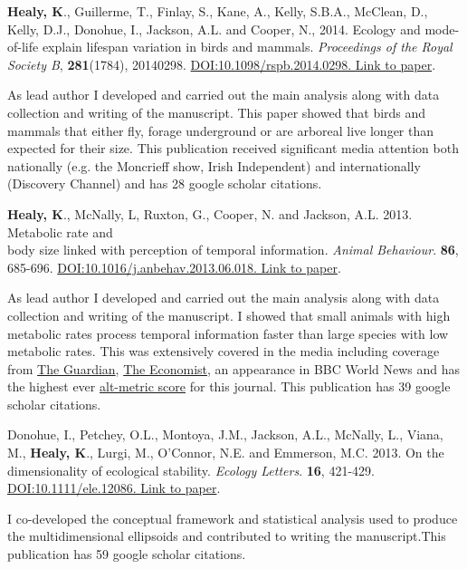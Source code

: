 \documentclass[10pt,a4paper]{article}
\begin{document}
\begin{flushleft}
\bigskip

\textbf{Healy, K}., Guillerme, T., Finlay, S., Kane, A., Kelly, S.B.A., McClean, D., Kelly, D.J., Donohue, I., Jackson, A.L. and Cooper, N., 2014. Ecology and mode-of-life explain lifespan variation in birds and mammals. \textit{Proceedings of the Royal Society B}, \textbf{281}(1784), 20140298. \href{http://rspb.royalsocietypublishing.org/content/281/1784/20140298}{DOI:10.1098/rspb.2014.0298. Link to paper}.
\smallskip
\par{\fontsize{10.5}{10} As lead author I developed and carried out the main analysis along with data collection and writing of the manuscript. This paper showed that birds and mammals that either fly, forage underground or are arboreal live longer than expected for their size. This publication received significant media attention both nationally (e.g. the Moncrieff show, Irish Independent) and internationally (Discovery Channel) and has 28 google scholar citations.}

\bigskip

\textbf{Healy, K}., McNally, L, Ruxton, G., Cooper, N. and Jackson, A.L. 2013. Metabolic rate and\\
body size linked with perception of temporal information.  \textit{Animal Behaviour}. \textbf{86}, 685-696. \href{http://dx.doi.org/10.1016/j.anbehav.2013.06.018}{DOI:10.1016/j.anbehav.2013.06.018. Link to paper}.
\smallskip
\par{\fontsize{10.5}{10} As lead author I developed and carried out the main analysis along with data collection and writing of the manuscript. I showed that small animals with high metabolic rates process temporal information faster than large species with low metabolic rates. This was extensively covered in the media including coverage from 
\href{https://www.theguardian.com/science/2013/sep/16/time-passes-slowly-flies-study}{The Guardian}, 
\href{http://www.economist.com/news/science-and-technology/21586532-small-creatures-fast-metabolisms-see-world-action-replay-slo-mo}{The Economist},
 an appearance in BBC World News and has the highest ever \href{http://www.altmetric.com/details.php?key=517059da36b98ab7d4941284da32e5f7&citation_id=1705703&embedded=true}{alt-metric score} for this journal. This publication has 39 google scholar citations.} 

\bigskip

\setlength{\parindent}{0mm}Donohue, I., Petchey, O.L., Montoya, J.M., Jackson, A.L., McNally, L., Viana, M., \textbf{Healy, K}., Lurgi, M., O’Connor, N.E. and Emmerson, M.C. 2013. On the dimensionality of ecological stability. \textit{Ecology Letters}. \textbf{16}, 421-429. \href{http://onlinelibrary.wiley.com/doi/10.1111/ele.12086/abstract} {DOI:10.1111/ele.12086. Link to paper}. 
\smallskip
\par{\fontsize{10.5}{10} I co-developed the conceptual framework and statistical analysis used to produce the multidimensional ellipsoids and contributed to writing the manuscript.This publication has 59 google scholar citations.}
\bigskip



\end{flushleft}
\end{document}
